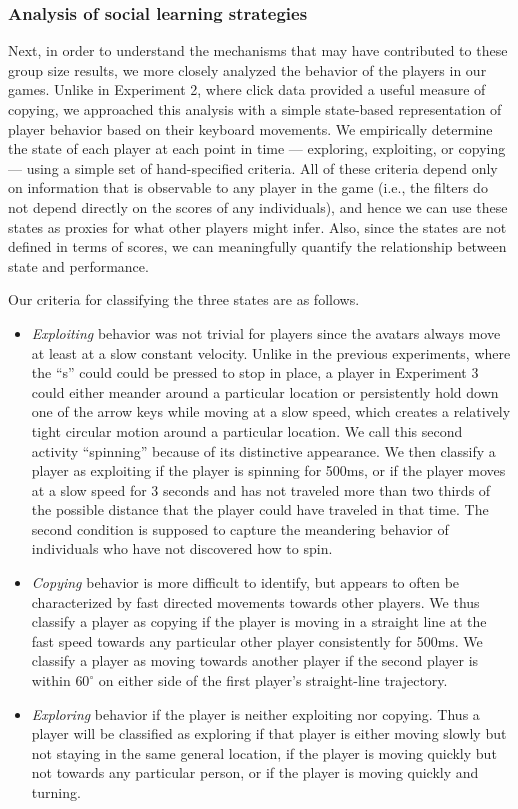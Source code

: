 \documentclass[12pt,letterpaper]{article}
\begin{document}
\subsubsection{Analysis of social learning strategies}

Next, in order to understand the mechanisms that may have contributed to these group size results, we more closely analyzed the behavior of the players in our games.
Unlike in Experiment 2, where click data provided a useful measure of copying, we approached this analysis with a simple state-based representation of player behavior based on their keyboard movements.
We empirically determine the state of each player at each point in time --- exploring, exploiting, or copying --- using a simple set of hand-specified criteria.
All of these criteria depend only on information that is observable to any player in the game (i.e., the filters do not depend directly on the scores of any individuals), and hence we can use these states as proxies for what other players might infer.
Also, since the states are not defined in terms of scores, we can meaningfully quantify the relationship between state and performance.

Our criteria for classifying the three states are as follows.
\begin{itemize}
\item \emph{Exploiting} behavior was not trivial for players since the avatars always move at least at a slow
constant velocity.  
Unlike in the previous experiments, where the ``s'' could could be pressed to stop in place, a player in Experiment 3 could either meander around a particular location or persistently hold down one of the arrow keys while moving at a slow speed, which creates a relatively tight circular motion around a particular location.  
We call this second activity ``spinning'' because of its distinctive appearance.  
We then classify a player as exploiting if the player is spinning for 500ms, or if the player moves at a slow speed for 3 seconds and has not traveled more than two thirds of the possible distance that the player could have traveled in that time.
The second condition is supposed to capture the meandering behavior of individuals who have not discovered how to spin.  
\item \emph{Copying} behavior is more difficult to identify, but appears to often be characterized by fast directed movements towards other players. We thus classify a player as copying if the player is moving in a straight line at the fast speed towards any particular other player consistently for 500ms.
We classify a player as moving towards another player if the second player is within $60^\circ$ on either side of the first player's straight-line trajectory.  
\item \emph{Exploring} behavior if the player is neither exploiting nor copying. Thus a player will be classified as exploring if that player is either moving slowly but not staying in the same general location, if the player is moving quickly but not towards any particular person, or if the player is moving quickly and turning.
\end{itemize}
\end{document}
